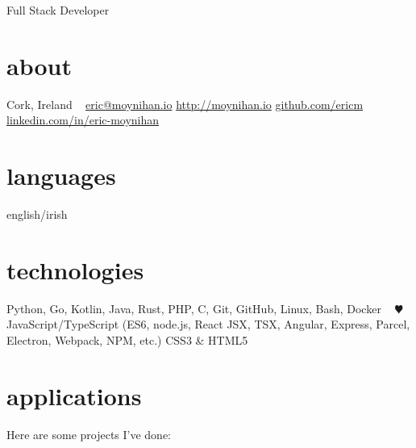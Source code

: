 \documentclass[10pt]{friggeri-cv}
\begin{document}
       {Full Stack Developer}


\begin{aside}
  \section{about}
    Cork,
    Ireland
    ~
    \href{mailto:eric@moynihan.io}{eric@moynihan.io}
    \href{http://moynihan.io}{http://moynihan.io}
    \href{http://github.com/ericm}{github.com/ericm}
    \href{https://www.linkedin.com/in/eric-moynihan}{linkedin.com/in/eric-moynihan}
  \section{languages}
    english/irish
  \section{technologies}
    Python, Go, Kotlin,
    Java, Rust, PHP,
    C, Git, GitHub,
    Linux, Bash, Docker
    ~
    {\color{red} $\varheartsuit$} JavaScript/TypeScript
    (ES6, node.js, React JSX, TSX, Angular, Express, Parcel, Electron, Webpack, NPM, etc.)
    CSS3 \& HTML5
    
\end{aside}

\section{applications}

Here are some projects I've done:
\end{document}
